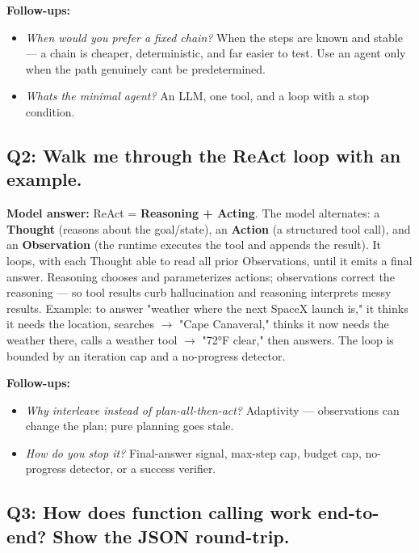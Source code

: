 \documentclass[11pt]{article}
\providecommand{\tightlist}{\setlength{\itemsep}{1pt}\setlength{\parskip}{0pt}}
\begin{document}
\textbf{Follow-ups:}

\begin{itemize}
\tightlist
\item
  \emph{When would you prefer a fixed chain?} When the steps are known and stable --- a chain is cheaper, deterministic, and far easier to test. Use an agent only when the path genuinely can\textquotesingle t be predetermined.
\item
  \emph{What\textquotesingle s the minimal agent?} An LLM, one tool, and a loop with a stop condition.
\end{itemize}

\subsection{Q2: Walk me through the ReAct loop with an example.}\label{q2-walk-me-through-the-react-loop-with-an-example}

\textbf{Model answer:} ReAct = \textbf{Reasoning + Acting}. The model alternates: a \textbf{Thought} (reasons about the goal/state), an \textbf{Action} (a structured tool call), and an \textbf{Observation} (the runtime executes the tool and appends the result). It loops, with each Thought able to read all prior Observations, until it emits a final answer. Reasoning chooses and parameterizes actions; observations correct the reasoning --- so tool results curb hallucination and reasoning interprets messy results. Example: to answer "weather where the next SpaceX launch is," it thinks it needs the location, searches \(\rightarrow\) "Cape Canaveral," thinks it now needs the weather there, calls a weather tool \(\rightarrow\) "72°F clear," then answers. The loop is bounded by an iteration cap and a no-progress detector.

\textbf{Follow-ups:}

\begin{itemize}
\tightlist
\item
  \emph{Why interleave instead of plan-all-then-act?} Adaptivity --- observations can change the plan; pure planning goes stale.
\item
  \emph{How do you stop it?} Final-answer signal, max-step cap, budget cap, no-progress detector, or a success verifier.
\end{itemize}

\subsection{Q3: How does function calling work end-to-end? Show the JSON round-trip.}\label{q3-how-does-function-calling-work-end-to-end-show-the-json-round-trip}
\end{document}
